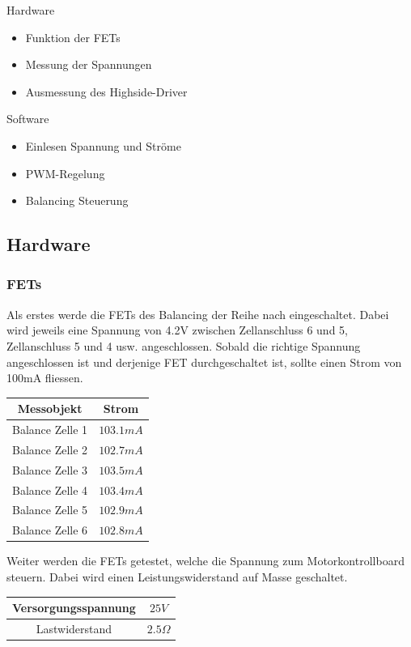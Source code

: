 Hardware
\begin{itemize}
	\item Funktion der FETs
	\item Messung der Spannungen
	\item Ausmessung des Highside-Driver
\end{itemize}
Software
\begin{itemize}
	\item Einlesen Spannung und Ströme
	\item PWM-Regelung
	\item Balancing Steuerung
\end{itemize}

\subsection{Hardware}
\subsubsection*{FETs}
Als erstes werde die FETs des Balancing der Reihe nach eingeschaltet. Dabei wird jeweils eine Spannung von 4.2V zwischen Zellanschluss 6 und 5, Zellanschluss 5 und 4 usw. angeschlossen. Sobald die richtige Spannung angeschlossen ist und derjenige FET durchgeschaltet ist, sollte einen Strom von 100mA fliessen. 

\begin{center}
	\begin{tabular}{|c|c|}
		\hline 
		Messobjekt & Strom \\ \hline
		Balance Zelle 1 & $103.1mA$ \\ \hline
		Balance Zelle 2 & $102.7mA$ \\ \hline
		Balance Zelle 3 & $103.5mA$ \\ \hline
		Balance Zelle 4 & $103.4mA$ \\ \hline
		Balance Zelle 5 & $102.9mA$ \\ \hline
		Balance Zelle 6 & $102.8mA$ \\ \hline
	\end{tabular} 
	\label{tab:StromBalancing}
\end{center}

Weiter werden die FETs getestet, welche die Spannung zum Motorkontrollboard steuern. Dabei wird einen Leistungswiderstand auf Masse geschaltet. 

\begin{center}
	\begin{tabular}{|c|c|}
		\hline 
		Versorgungsspannung & $25V$ \\ \hline
		Lastwiderstand & $2.5\Omega$ \\ \hline
	\end{tabular} 
	\label{tab:fetmessbedzumotorcontrol}
\end{center}

